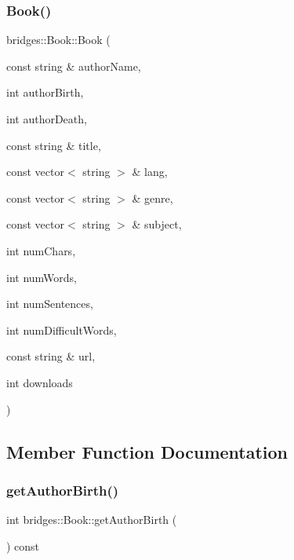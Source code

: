 \subsubsection{\texorpdfstring{Book()}{Book()}\hspace{0.1cm}{\footnotesize\ttfamily [2/2]}}
{\footnotesize\ttfamily bridges\+::\+Book\+::\+Book (\begin{DoxyParamCaption}\item[{const string \&}]{author\+Name,  }\item[{int}]{author\+Birth,  }\item[{int}]{author\+Death,  }\item[{const string \&}]{title,  }\item[{const vector$<$ string $>$ \&}]{lang,  }\item[{const vector$<$ string $>$ \&}]{genre,  }\item[{const vector$<$ string $>$ \&}]{subject,  }\item[{int}]{num\+Chars,  }\item[{int}]{num\+Words,  }\item[{int}]{num\+Sentences,  }\item[{int}]{num\+Difficult\+Words,  }\item[{const string \&}]{url,  }\item[{int}]{downloads }\end{DoxyParamCaption})\hspace{0.3cm}{\ttfamily [inline]}}



\subsection{Member Function Documentation}
\mbox{\label{classbridges_1_1_book_ac2c02b94f40eaddc7a2cca3f90976093}} 
\subsubsection{\texorpdfstring{get\+Author\+Birth()}{getAuthorBirth()}}
{\footnotesize\ttfamily int bridges\+::\+Book\+::get\+Author\+Birth (\begin{DoxyParamCaption}{ }\end{DoxyParamCaption}) const\hspace{0.3cm}{\ttfamily [inline]}}

